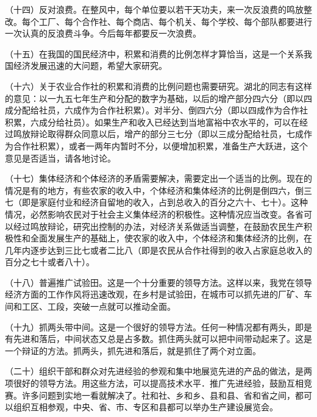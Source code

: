 （十四）反对浪费。在整风中，每个单位要以若干天功夫，来一次反浪费的鸣放整改。每个工厂、每个合作社、每个商店、每个机关、每个学校、每个部队都要进行一次认真的反浪费斗争。今后每年都要反一次浪费。

（十五）在我国的国民经济中，积累和消费的比例怎样才算恰当，这是一个关系我国经济发展迅速的大问题，希望大家研究。

（十六）关于农业合作社的积累和消费的比例问题也需要研究。湖北的同志有这样的意见：以一九五七年生产和分配的数字为基础，以后的增产部分四六分（即以四成分配给社员，六成作为合作社积累）。对半分、倒四六分（即以四成作为合作社积累，六成分给社员）。如果生产和收入已经达到当地富裕中农水平的，可以在经过鸣放辩论取得群众同意以后，增产的部分三七分（即以三成分配给社员，七成作为合作社积累），或者一两年内暂时不分，以便增加积累，准备生产大跃进，这个意见是否适当，请各地讨论。

（十七）集体经济和个体经济的矛盾需要解决，需要定出一个适当的比例。现在的情况是有的地方，有些农家的收入中，个体经济和集体经济的比例是倒四六，倒三七（即是家庭付业和经济自留地的收入，占到总收入的百分之六十、七十）。这种情况，必然影响农民对于社会主义集体经济的积极性。这种情况应当改变。各省可以经过鸣放辩论，研究出控制的办法，对经济关系做适当调整，在鼓励农民生产积极性和全面发展生产的基础上，使农家的收入中，个体经济和集体经济的比例，在几年内逐步达到三比七或者二比八（即是农民从合作社得到的收入占家庭总收入的百分之七十或者八十）。

（十八）普遍推广试验田。这是一个十分重要的领导方法。这样以来，我党在领导经济方面的工作作风将迅速改观，在乡村是试验田，在城市可以抓先进的厂矿、车间和工区、工段，突破一点就可以推动全面。

（十九）抓两头带中间。这是一个很好的领导方法。任何一种情况都有两头，即是有先进和落后，中间状态又总是占多数。抓住两头就可以把中间带动起来了。这是一个辩证的方法。抓两头，抓先进和落后，就是抓住了两个对立面。

（二十）组织干部和群众对先进经验的参观和集中地展览先进的产品的做法，是两项很好的领导方法。用这些方法，可以提高技术水平．推广先进经验，鼓励互相竞赛。许多问题到实地一看就解决了。社和社、乡和乡、县和县、省和省之间，都可以组织互相参观，中央、省、市、专区和县都可以举办生产建设展览会。

